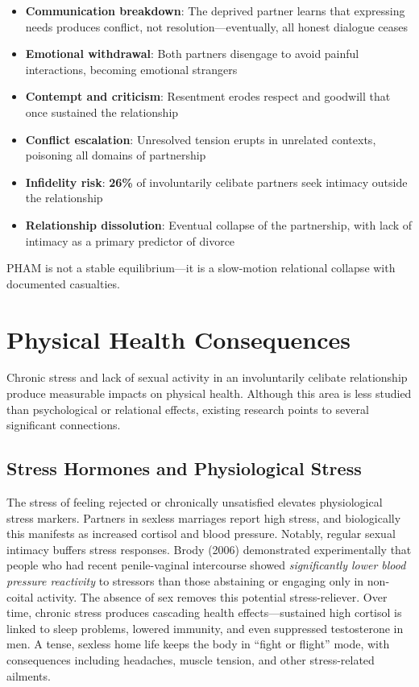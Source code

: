 \documentclass[12pt,openany]{book}
\numberwithin{equation}{chapter}
\begin{document}
\begin{itemize}
    \item \textbf{Communication breakdown}: The deprived partner learns that expressing needs produces conflict, not resolution---eventually, all honest dialogue ceases
    \item \textbf{Emotional withdrawal}: Both partners disengage to avoid painful interactions, becoming emotional strangers
    \item \textbf{Contempt and criticism}: Resentment erodes respect and goodwill that once sustained the relationship
    \item \textbf{Conflict escalation}: Unresolved tension erupts in unrelated contexts, poisoning all domains of partnership
    \item \textbf{Infidelity risk}: \textbf{26\%} of involuntarily celibate partners seek intimacy outside the relationship
    \item \textbf{Relationship dissolution}: Eventual collapse of the partnership, with lack of intimacy as a primary predictor of divorce
\end{itemize}

PHAM is not a stable equilibrium---it is a slow-motion relational collapse with documented casualties.

\section{Physical Health Consequences}

Chronic stress and lack of sexual activity in an involuntarily celibate relationship produce measurable impacts on physical health. Although this area is less studied than psychological or relational effects, existing research points to several significant connections.

\subsection{Stress Hormones and Physiological Stress}

The stress of feeling rejected or chronically unsatisfied elevates physiological stress markers. Partners in sexless marriages report high stress, and biologically this manifests as increased cortisol and blood pressure. Notably, regular sexual intimacy buffers stress responses. Brody (2006) demonstrated experimentally that people who had recent penile-vaginal intercourse showed \textit{significantly lower blood pressure reactivity} to stressors than those abstaining or engaging only in non-coital activity. The absence of sex removes this potential stress-reliever. Over time, chronic stress produces cascading health effects---sustained high cortisol is linked to sleep problems, lowered immunity, and even suppressed testosterone in men. A tense, sexless home life keeps the body in ``fight or flight'' mode, with consequences including headaches, muscle tension, and other stress-related ailments.
\end{document}
